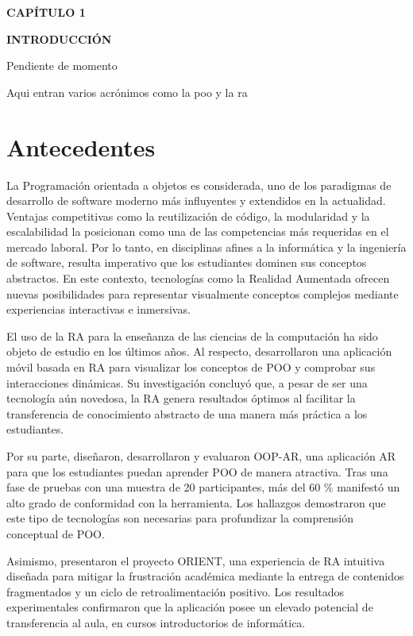 
\setcounter{chapter}{1} 
{\centering
{\large\bfseries CAPÍTULO 1}\par\vspace{0.3cm}
{\Large\bfseries INTRODUCCIÓN}\par}
\vspace{1cm}

Pendiente de momento

Aqui entran varios acrónimos como la \ac{poo} y la \ac{ra}

\section{Antecedentes}
La Programación orientada a objetos es considerada, uno de los paradigmas de desarrollo de software 
moderno más influyentes y extendidos en la actualidad. Ventajas competitivas 
como la reutilización de código, la modularidad y la escalabilidad la posicionan 
como una de las competencias más requeridas en el mercado laboral. Por lo tanto, 
en disciplinas afines a la informática y la ingeniería de software, resulta 
imperativo que los estudiantes dominen sus conceptos abstractos. En este 
contexto, tecnologías como la Realidad Aumentada ofrecen nuevas 
posibilidades para representar visualmente conceptos complejos mediante 
experiencias interactivas e inmersivas.

El uso de la RA para la enseñanza de las ciencias de la computación ha sido 
objeto de estudio en los últimos años. Al respecto, \textcite{Rizwan2019} 
desarrollaron una aplicación móvil basada en RA para visualizar los 
conceptos de POO y comprobar sus interacciones dinámicas. Su investigación 
concluyó que, a pesar de ser una tecnología aún novedosa, la RA genera 
resultados óptimos al facilitar la transferencia de conocimiento abstracto 
de una manera más práctica a los estudiantes.

Por su parte, \textcite{Abidin2020} diseñaron, desarrollaron y 
evaluaron OOP-AR, una aplicación AR para que los estudiantes puedan aprender 
POO de manera atractiva. Tras una fase de pruebas con una muestra de 20 
participantes, más del 60 \% manifestó un alto grado de conformidad con la 
herramienta. Los hallazgos demostraron que este tipo de tecnologías son 
necesarias para profundizar la comprensión conceptual de POO.

Asimismo, \textcite{kar2022} presentaron el proyecto ORIENT, una 
experiencia de RA intuitiva diseñada para mitigar la frustración académica 
mediante la entrega de contenidos fragmentados y un ciclo de retroalimentación 
positivo. Los resultados experimentales confirmaron que la aplicación posee 
un elevado potencial de transferencia al aula, en cursos introductorios de 
informática.

